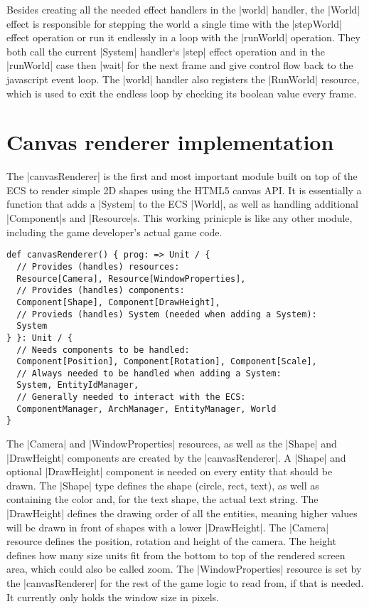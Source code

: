 Besides creating all the needed effect handlers in the |world| handler, the |World| effect is responsible for stepping the world a single time with the |stepWorld| effect operation or run it endlessly in a loop with the |runWorld| operation. They both call the current |System| handler`s |step| effect operation and in the |runWorld| case then |wait| for the next frame and give control flow back to the javascript event loop. The |world| handler also registers the |RunWorld| resource, which is used to exit the endless loop by checking its boolean value every frame.

\section{Canvas renderer implementation}

The |canvasRenderer| is the first and most important module built on top of the ECS to render simple 2D shapes using the HTML5 canvas API. It is essentially a function that adds a |System| to the ECS |World|, as well as handling additional |Component|s and |Resource|s. This working prinicple is like any other module, including the game developer's actual game code.

\begin{lstlisting}[caption=canvasRenderer signiture]
def canvasRenderer() { prog: => Unit / {
  // Provides (handles) resources:
  Resource[Camera], Resource[WindowProperties],
  // Provides (handles) components:
  Component[Shape], Component[DrawHeight],
  // Provieds (handles) System (needed when adding a System):
  System
} }: Unit / {
  // Needs components to be handled:
  Component[Position], Component[Rotation], Component[Scale],
  // Always needed to be handled when adding a System:
  System, EntityIdManager,
  // Generally needed to interact with the ECS:
  ComponentManager, ArchManager, EntityManager, World
}
\end{lstlisting}

The |Camera| and |WindowProperties| resources, as well as the |Shape| and |DrawHeight| components are created by the |canvasRenderer|. A |Shape| and optional |DrawHeight| component is needed on every entity that should be drawn. The |Shape| type defines the shape (circle, rect, text), as well as containing the color and, for the text shape, the actual text string. The |DrawHeight| defines the drawing order of all the entities, meaning higher values will be drawn in front of shapes with a lower |DrawHeight|. The |Camera| resource defines the position, rotation and height of the camera. The height defines how many size units fit from the bottom to top of the rendered screen area, which could also be called zoom. The |WindowProperties| resource is set by the |canvasRenderer| for the rest of the game logic to read from, if that is needed. It currently only holds the window size in pixels.

